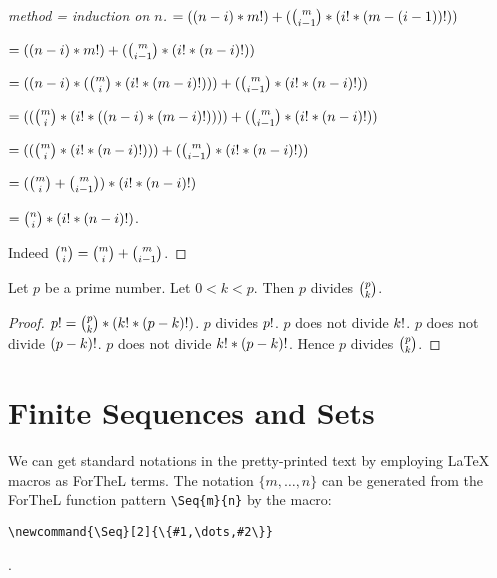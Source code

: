 \documentclass[english,11pt]{article}
\newcommand{\Seq}[2]{\{#1,\dots,#2\}}
\begin{document}
\begin{forthel}
\begin{proof}[method = induction on $n$]
$=  ((n-i) * m !) + ({m \choose i-1} * (i ! * (m - (i-1)) !))$

$=  ((n-i) * m !) + ({m \choose i-1} * (i ! * (n-i) !))$

$= ((n-i) * ({m \choose i} * (i ! * (m-i) !))) + ({m \choose i-1} * (i ! * (n-i) !))$

$= (({m \choose i} * (i ! * ((n-i) * (m-i) !)))) + ({m \choose i-1} * (i ! * (n-i) !))$

$= (({m \choose i} * (i ! * (n-i) !))) + ({m \choose i-1} * (i ! * (n-i) !))$

$= ({m \choose i} + {m \choose i-1}) * (i ! * (n-i) !) $

$=  {n \choose i} * (i ! * (n-i) !)$.

Indeed ${n \choose i} = {m \choose i} + {m \choose i-1}$.

\end{proof}


\begin{lemma}
Let $p$ be a prime number.
Let $0 < k < p$. Then
$p$ divides ${p \choose k}$.
\end{lemma}
\begin{proof}
$p ! = {p \choose k} * (k ! * (p-k) !)$.
$p$ divides $p !$.
$p$ does not divide $k !$.
$p$ does not divide $(p-k) !$.
$p$ does not divide $k ! * (p-k) !$.
Hence 
$p$ divides ${p \choose k}$.
\end{proof}

\end{forthel}


\section{Finite Sequences and Sets}

We can get standard notations in the pretty-printed
text by employing \LaTeX{} macros as ForTheL terms.
The notation $\Seq{m}{n}$ can be generated 
from the ForTheL function pattern
\verb+\Seq{m}{n}+ 
by the 
macro:
\begin{verbatim}
\newcommand{\Seq}[2]{\{#1,\dots,#2\}}
\end{verbatim}.
\end{document}
